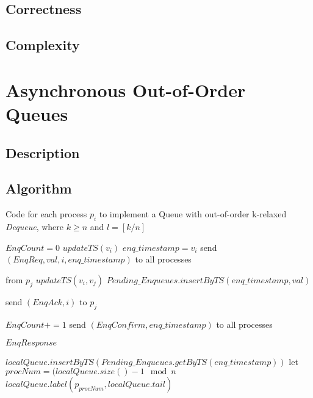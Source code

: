 \documentclass[a4paper,USenglish]{lipics-v2021} %
\begin{document}
\subsection{Correctness}



\subsection{Complexity}

\section{Asynchronous Out-of-Order Queues}

\subsection{Description}

\subsection{Algorithm}

\begin{algorithm}
  \caption{Code for each process $p_i$ to implement a Queue with out-of-order k-relaxed \textit{Dequeue}, where $k \geq n$ and $l = [k/n]$}
  \begin{algorithmic}[1]
      \State $EnqCount = 0$
      \State $updateTS(v_i)$
      \State $enq\_timestamp = v_i$
      \State send $(EnqReq, val, i, enq\_timestamp)$ to all processes
    \EndFunction

     from $p_j$
      \State $updateTS(v_i, v_j)$
        \State $Pending\_Enqueues.insertByTS(enq\_timestamp, val)$
      \EndIf

      \State send $(EnqAck, i)$ to $p_j$
    \EndFunction

      \State $EnqCount += 1$
          \State send $(EnqConfirm, enq\_timestamp)$ to all processes
        \EndIf
      \EndIf

      \State \Return $EnqResponse$
    \EndFunction

      \State $localQueue.insertByTS(Pending\_Enqueues.getByTS(enq\_timestamp))$
       
        \State let $procNum = (localQueue.size() -1 \mod n$
        \State $localQueue.label(p_{procNum}, localQueue.tail)$
      \EndIf
    \EndFunction
  \end{algorithmic}
\end{algorithm}
\end{document}
